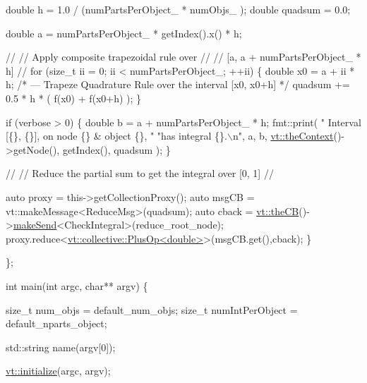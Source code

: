 \begin{DoxyCodeInclude}
    \textcolor{keywordtype}{double} h = 1.0 / (numPartsPerObject\_ * numObjs\_ );
    \textcolor{keywordtype}{double} quadsum = 0.0;

    \textcolor{keywordtype}{double} a = numPartsPerObject\_ * getIndex().x() * h;

    \textcolor{comment}{//}
    \textcolor{comment}{// Apply composite trapezoidal rule over}
    \textcolor{comment}{//}
    \textcolor{comment}{// [a, a + numPartsPerObject\_ * h]}
    \textcolor{comment}{//}
    \textcolor{keywordflow}{for} (\textcolor{keywordtype}{size\_t} ii = 0; ii < numPartsPerObject\_; ++ii) \{
      \textcolor{keywordtype}{double} x0 = a + ii * h;
      \textcolor{comment}{/* --- Trapeze Quadrature Rule over the interval [x0, x0+h] */}
      quadsum += 0.5 * h * ( f(x0) + f(x0+h) );
    \}

    \textcolor{keywordflow}{if} (verbose > 0) \{
      \textcolor{keywordtype}{double} b = a + numPartsPerObject\_ * h;
      fmt::print(
        \textcolor{stringliteral}{" Interval [\{\}, \{\}], on node \{\} & object \{\}, "}
        \textcolor{stringliteral}{"has integral \{\}.\(\backslash\)n"}, a, b, \hyperlink{namespacevt_a26551fe0e6e6a1371111df5b12c7e92c}{vt::theContext}()->getNode(),
        getIndex(), quadsum
      );
    \}

    \textcolor{comment}{//}
    \textcolor{comment}{// Reduce the partial sum to get the integral over [0, 1]}
    \textcolor{comment}{//}

    \textcolor{keyword}{auto} proxy = this->getCollectionProxy();
    \textcolor{keyword}{auto} msgCB = vt::makeMessage<ReduceMsg>(quadsum);
    \textcolor{keyword}{auto} cback = \hyperlink{namespacevt_a673b109e94c7bca58313504c83e1da94}{vt::theCB}()->\hyperlink{structvt_1_1pipe_1_1_pipe_manager_a73583be6260418b13ee66e56cdade2da}{makeSend}<CheckIntegral>(reduce\_root\_node);
    proxy.reduce<\hyperlink{structvt_1_1collective_1_1reduce_1_1operators_1_1_plus_op}{vt::collective::PlusOp<double>}>(msgCB.get(),cback);
  \}

\};


\textcolor{keywordtype}{int} main(\textcolor{keywordtype}{int} argc, \textcolor{keywordtype}{char}** argv) \{

  \textcolor{keywordtype}{size\_t} num\_objs = default\_num\_objs;
  \textcolor{keywordtype}{size\_t} numIntPerObject = default\_nparts\_object;

  std::string name(argv[0]);

  \hyperlink{namespacevt_aaa266774ea8339c58be0202b00fafa62}{vt::initialize}(argc, argv);


\end{DoxyCodeInclude}
